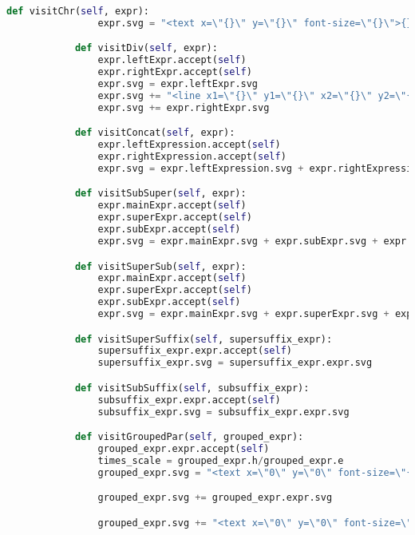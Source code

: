 \begin{lstlisting}[language=Python]
            def visitChr(self, expr):
                expr.svg = "<text x=\"{}\" y=\"{}\" font-size=\"{}\">{}</text> \n".format(expr.x, expr.y, expr.e, expr.character)

            def visitDiv(self, expr):
                expr.leftExpr.accept(self)
                expr.rightExpr.accept(self)
                expr.svg = expr.leftExpr.svg
                expr.svg += "<line x1=\"{}\" y1=\"{}\" x2=\"{}\" y2=\"{}\" stroke-width=\"0.03\" stroke=\"black\"/>".format(expr.x, expr.y-expr.e*0.45, expr.x + expr.a, expr.y-expr.e*0.45)
                expr.svg += expr.rightExpr.svg

            def visitConcat(self, expr):
                expr.leftExpression.accept(self)
                expr.rightExpression.accept(self)
                expr.svg = expr.leftExpression.svg + expr.rightExpression.svg

            def visitSubSuper(self, expr):
                expr.mainExpr.accept(self)
                expr.superExpr.accept(self)
                expr.subExpr.accept(self)
                expr.svg = expr.mainExpr.svg + expr.subExpr.svg + expr.superExpr.svg

            def visitSuperSub(self, expr):
                expr.mainExpr.accept(self)
                expr.superExpr.accept(self)
                expr.subExpr.accept(self)
                expr.svg = expr.mainExpr.svg + expr.superExpr.svg + expr.subExpr.svg

            def visitSuperSuffix(self, supersuffix_expr):
                supersuffix_expr.expr.accept(self)
                supersuffix_expr.svg = supersuffix_expr.expr.svg

            def visitSubSuffix(self, subsuffix_expr):
                subsuffix_expr.expr.accept(self)
                subsuffix_expr.svg = subsuffix_expr.expr.svg

            def visitGroupedPar(self, grouped_expr):
                grouped_expr.expr.accept(self)
                times_scale = grouped_expr.h/grouped_expr.e
                grouped_expr.svg = "<text x=\"0\" y=\"0\" font-size=\"{}\" transform=\"translate({},{}) scale(1,{})\">(</text> \n".format(grouped_expr.e, grouped_expr.x, grouped_expr.y-(times_scale-1)*0.2*grouped_expr.e, times_scale)

                grouped_expr.svg += grouped_expr.expr.svg

                grouped_expr.svg += "<text x=\"0\" y=\"0\" font-size=\"{}\" transform=\"translate({},{}) scale(1,{})\">)</text> \n".format(grouped_expr.e, grouped_expr.x + grouped_expr.a - 0.6*grouped_expr.e, grouped_expr.y-(times_scale-1)*0.2*grouped_expr.e, times_scale)

    \end{lstlisting}



